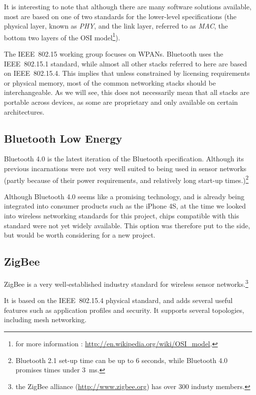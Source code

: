 It is interesting to note that although there are many software solutions
available, most are based on one of two standards for the lower-level
specifications (the physical layer, known as \emph{PHY}, and the link layer,
referred to as \emph{MAC}, the bottom two layers of the OSI model\footnote{for
more information : \url{http://en.wikipedia.org/wiki/OSI_model}.}).

The IEEE~802.15 working group focuses on \ac{WPAN}s. Bluetooth uses the
IEEE~802.15.1 standard, while almost all other stacks referred to here are based
on IEEE~802.15.4. This implies that unless constrained by licensing requirements
or physical memory, most of the common networking stacks should be
interchangeable. As we will see, this does not necessarily mean that all stacks
are portable across devices, as some are proprietary and only available on
certain architectures.

\subsection{Bluetooth Low Energy}\label{sub:bluetooth}

Bluetooth 4.0 is the latest iteration of the Bluetooth specification. Although
its previous incarnations were not very well suited to being used in sensor
networks (partly because of their power requirements, and relatively long
start-up times.)\footnote{Bluetooth 2.1 set-up time can be up to 6 seconds,
while Bluetooth 4.0 promises times under \SI{3}{ms}. }

Although Bluetooth 4.0 seems like a promising technology, and is already being
integrated into consumer products such as the iPhone 4S, at the time we looked
into wireless networking standards for this project, chips compatible with this
standard were not yet widely available. This option was therefore put to the
side, but would be worth considering for a new project.

\subsection{ZigBee}\label{sub:zigbee}

ZigBee is a very well-established industry standard for wireless sensor
networks.\footnote{the ZigBee alliance (\url{http://www.zigbee.org}) has over
300 industy members.}

It is based on the IEEE~802.15.4 physical standard, and adds several
useful features such as application profiles and security. It supports several
topologies, including mesh networking.

